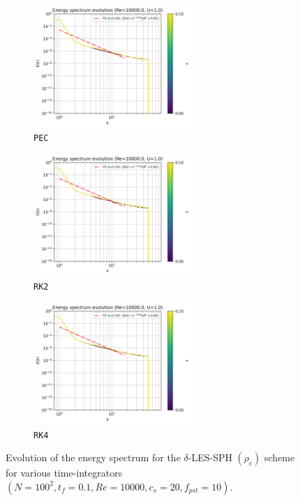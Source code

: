 \begin{figure}[H]
  \begin{subfigure}{7cm}
    \centering\includegraphics[width=6cm]{Code-Figures/deltales/integrator/c0_20_tait_pec_dtmul_1_nx_100_pst_10_re_10000_deltales/energy_spectrum_evolution.png}
    \caption{\texttt{PEC}}
  \end{subfigure}
  \begin{subfigure}{7cm}
    \centering\includegraphics[width=6cm]{Code-Figures/deltales/integrator/c0_20_tait_rk2_dtmul_1.5_nx_100_pst_10_re_10000_deltales/energy_spectrum_evolution.png}
    \caption{\texttt{RK2}}
  \end{subfigure}
  \begin{subfigure}{7cm}
    \centering\includegraphics[width=6cm]{Code-Figures/deltales/integrator/c0_20_tait_rk4_dtmul_2_nx_100_pst_10_re_10000_deltales/energy_spectrum_evolution.png}
    \caption{\texttt{RK4}}
  \end{subfigure}
  \caption{Evolution of the energy spectrum for the $\delta$-LES-SPH $(\rho_c)$ scheme for various time-integrators $(N=100^2, t_f=0.1, Re=10000, c_s=20, f_{pst}=10)$.}
  \label{fig:deltales-integrator-espec}
\end{figure}



